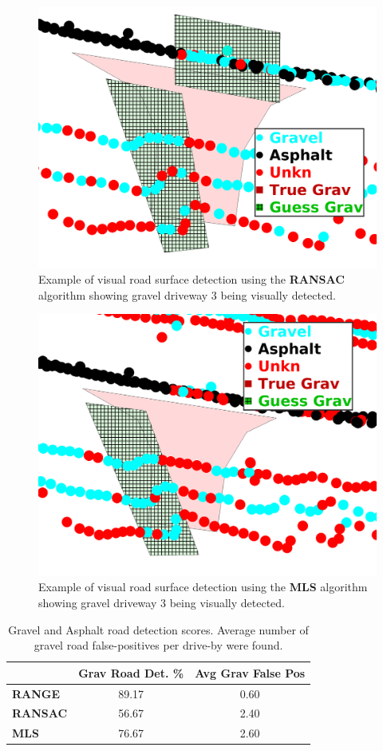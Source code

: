 \documentclass[numbered,pdftex]{ohio-etd}
\begin{document}
{{{		\begin{figure}[H]
			\centering
			\includegraphics[width=0.5\linewidth]{Defense_Images/ransac_db_6_overlap_2}
			\caption[Visual Scores: RANSAC]{Example of visual road surface detection using the \textbf{RANSAC} algorithm showing gravel driveway $3$ being visually detected.}
			\label{fig:ransac_example_vis_score}
		\end{figure}
		
		\begin{figure}[H]
			\centering
			\includegraphics[width=0.5\linewidth]{Defense_Images/mls_db_6_overlap_2}
			\caption[Visual Scores: MLS]{Example of visual road surface detection using the \textbf{MLS} algorithm showing gravel driveway $3$ being visually detected.}
			\label{fig:mls_example_vis_score}
		\end{figure}
		
		\begin{table}[H]
			\centering
			\begin{tabular}{l|c|c}
									& Grav Road Det. \% 	& Avg Grav False Pos\footnotemark	\\
				\hline
				\textbf{RANGE}  	& 89.17       			& 0.60	\\[-4pt]
				\textbf{RANSAC} 	& 56.67       			& 2.40	\\[-4pt]
				\textbf{MLS}    	& 76.67 				& 2.60		
			\end{tabular}
			\caption[Road Area Detection Score]{Gravel and Asphalt road detection scores. Average number of gravel road false-positives per drive-by were found.}
			\label{tab:road_area_overlap_score}
		\end{table}
	
}}}
\end{document}
